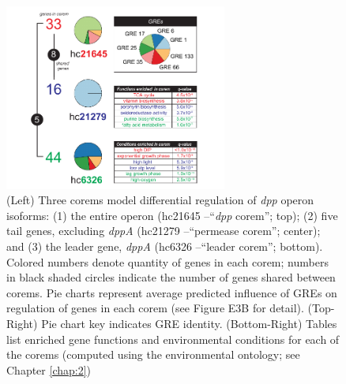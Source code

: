 \begin{figure}[h!]
    \centering
    \includegraphics[width=0.65\textwidth]{figures/egrin2_dpp_2}
 	\caption[Functional consequences of multiple transcript isoforms from the same operon, \halo]{ (Left) Three \halo corems model differential regulation of \textit{dpp} operon isoforms: (1) the entire operon (hc21645 –“\textit{dpp} corem”; top); (2) five tail genes, excluding \textit{dppA} (hc21279 –“permease corem”; center); and (3) the leader gene, \textit{dppA} (hc6326 –“leader corem”; bottom). Colored numbers denote quantity of genes in each corem; numbers in black shaded circles indicate the number of genes shared between corems. Pie charts represent average predicted influence of GREs on regulation of genes in each corem (see Figure E3B for detail). (Top-Right) Pie chart key indicates GRE identity. (Bottom-Right) Tables list enriched gene functions \cite{dennis_david:_2003} and environmental conditions for each of the corems (computed using the environmental ontology; see Chapter \ref{chap:2})
}
    \label{fig:egrin2:3:B}
\end{figure}


